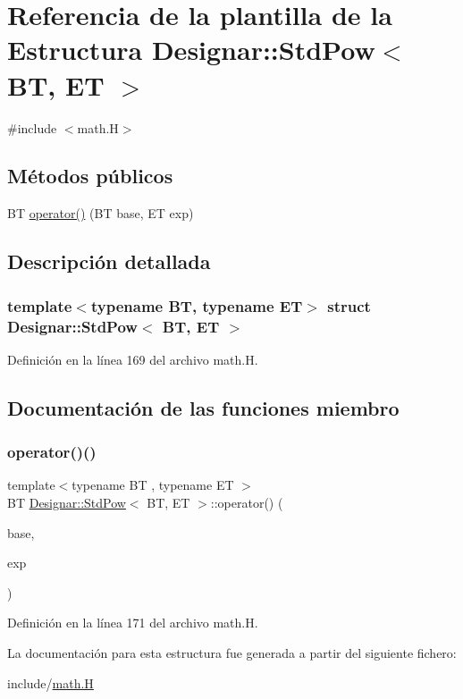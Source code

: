 \hypertarget{struct_designar_1_1_std_pow}{}\section{Referencia de la plantilla de la Estructura Designar\+:\+:Std\+Pow$<$ BT, ET $>$}
\label{struct_designar_1_1_std_pow}


{\ttfamily \#include $<$math.\+H$>$}

\subsection*{Métodos públicos}
\begin{DoxyCompactItemize}
\item 
BT \hyperlink{struct_designar_1_1_std_pow_a76ed6112976493eda665ec60c537145f}{operator()} (BT base, ET exp)
\end{DoxyCompactItemize}


\subsection{Descripción detallada}
\subsubsection*{template$<$typename BT, typename ET$>$\newline
struct Designar\+::\+Std\+Pow$<$ B\+T, E\+T $>$}



Definición en la línea 169 del archivo math.\+H.



\subsection{Documentación de las funciones miembro}
\mbox{\label{struct_designar_1_1_std_pow_a76ed6112976493eda665ec60c537145f}} 
\subsubsection{\texorpdfstring{operator()()}{operator()()}}
{\footnotesize\ttfamily template$<$typename BT , typename ET $>$ \\
BT \hyperlink{struct_designar_1_1_std_pow}{Designar\+::\+Std\+Pow}$<$ BT, ET $>$\+::operator() (\begin{DoxyParamCaption}\item[{BT}]{base,  }\item[{ET}]{exp }\end{DoxyParamCaption})\hspace{0.3cm}{\ttfamily [inline]}}



Definición en la línea 171 del archivo math.\+H.



La documentación para esta estructura fue generada a partir del siguiente fichero\+:\begin{DoxyCompactItemize}
\item 
include/\hyperlink{math_8_h}{math.\+H}\end{DoxyCompactItemize}
